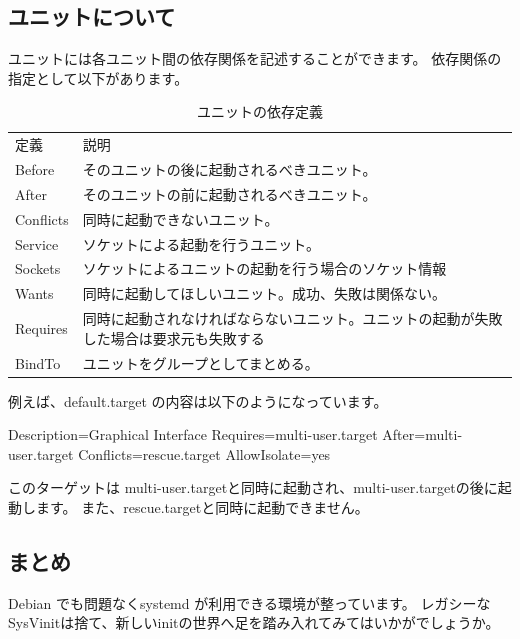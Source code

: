 \documentclass[mingoth,a4paper]{jsarticle}
\begin{document}
\subsection{ユニットについて}
ユニットには各ユニット間の依存関係を記述することができます。
依存関係の指定として以下があります。

\begin{table}[htb]
\begin{center}
  \begin{tabular}{ll}
    定義 & 説明 \\
    Before & そのユニットの後に起動されるべきユニット。 \\
    After & そのユニットの前に起動されるべきユニット。 \\
    Conflicts & 同時に起動できないユニット。 \\
    Service & ソケットによる起動を行うユニット。 \\
    Sockets & ソケットによるユニットの起動を行う場合のソケット情報 \\
    Wants  & 同時に起動してほしいユニット。成功、失敗は関係ない。\\
    Requires & 同時に起動されなければならないユニット。ユニットの起動が失敗した場合は要求元も失敗する \\
    BindTo & ユニットをグループとしてまとめる。
  \end{tabular}
\caption{ユニットの依存定義}
\label{tbl:unit-depends}
\end{center}
\end{table}

例えば、default.target の内容は以下のようになっています。
\begin{commandline}
[Unit]
Description=Graphical Interface
Requires=multi-user.target
After=multi-user.target
Conflicts=rescue.target
AllowIsolate=yes
\end{commandline}

このターゲットは
multi-user.targetと同時に起動され、multi-user.targetの後に起動します。
また、rescue.targetと同時に起動できません。

\subsection{まとめ}

Debian でも問題なくsystemd が利用できる環境が整っています。
レガシーなSysVinitは捨て、新しいinitの世界へ足を踏み入れてみてはいかがでしょうか。
\end{document}
